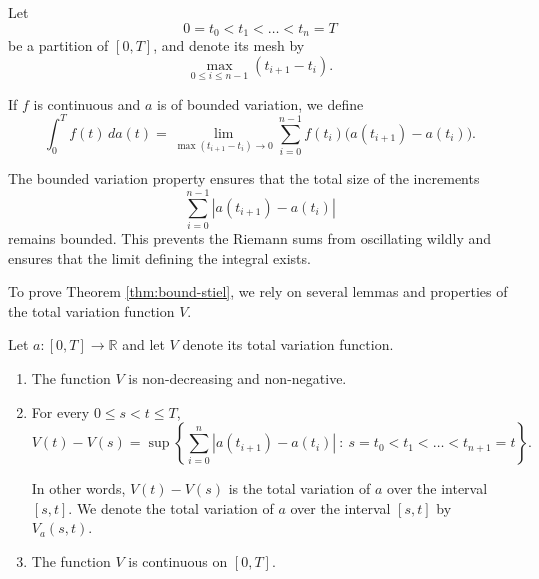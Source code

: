 \documentclass[10pt]{report}
\begin{document}
Let
\[
	0 = t_0 < t_1 < \dots < t_n = T
\]
be a partition of $[0,T]$, and denote its mesh by
\[
	\max_{0 \le i \le n-1} (t_{i+1}-t_i).
\]

If $f$ is continuous and $a$ is of bounded variation, we define
\[
	\int_0^T f(t)\, da(t)
	=
	\lim_{\max (t_{i+1}-t_i) \to 0}
	\sum_{i=0}^{n-1}
	f(t_i)\big(a(t_{i+1})-a(t_i)\big).
\]

The bounded variation property ensures that the total size of the increments
\[
	\sum_{i=0}^{n-1} |a(t_{i+1})-a(t_i)|
\]
remains bounded. This prevents the Riemann sums from oscillating wildly and
ensures that the limit defining the integral exists.

To prove Theorem \ref{thm:bound-stiel}, we rely on several lemmas and
properties of the total variation function $V$.

\prop
Let $a : [0,T] \to \mathbb{R}$ and let $V$ denote its total variation
function.

\begin{enumerate}

	\item The function $V$ is non-decreasing and non-negative.
	\item For every $0 \le s < t \le T$,
	      \[
		      V(t) - V(s)
		      =
		      \sup \left\{
		      \sum_{i=0}^{n}
		      |a(t_{i+1}) - a(t_i)|
		      \ : \
		      s = t_0 < t_1 < \dots < t_{n+1} = t
		      \right\}.
	      \]

	      In other words, $V(t)-V(s)$ is the total variation of $a$ over the
	      interval $[s,t]$. We denote the total variation of $a$ over the interval
	      $[s,t]$ by $V_a(s,t)$.

	\item The function $V$ is continuous on $[0,T]$.
\end{enumerate}
\end{document}
